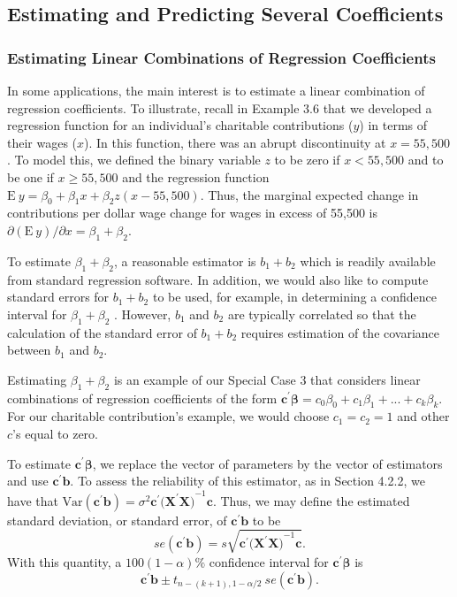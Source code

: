 \subsection{Estimating and Predicting Several Coefficients}

\subsubsection*{Estimating Linear Combinations of Regression Coefficients}

In some applications, the main interest is to estimate a linear
combination of regression coefficients. To illustrate, recall in
Example 3.6 that we developed a regression function for an
individual's charitable contributions ($y$) in terms of their wages
($x$). In this function, there was an abrupt discontinuity at
$x=55,500$. To model this, we defined the binary variable $z$ to be
zero if  $x<55,500$ and to be one if $x\geq 55,500$ and the
regression function $\mathrm{E~}y=\beta _{0}+\beta _{1}x+\beta
_{2}z(x-55,500)$. Thus, the marginal expected change in
contributions per dollar wage change for wages in excess of 55,500
is $\partial \left( \mathrm{E~}y\right) /\partial x=\beta _{1}+\beta
_{2}$.

To estimate $\beta _{1}+\beta _{2}$, a reasonable estimator is
$b_{1}+b_{2}$ which is readily available from standard regression
software. In addition, we would also like to compute standard errors
for $b_{1}+b_{2}$ to be used,
for example, in determining a confidence interval for $\beta _{1}+\beta _{2}$%
. However, $b_{1}$ and $b_{2}$ are typically correlated so that the
calculation of the standard error of $b_{1}+b_{2}$ requires
estimation of the covariance between $b_{1}$ and $b_{2}$.

Estimating $\beta_1 + \beta_2$ is an example of our Special Case 3
that considers linear combinations of regression coefficients of the
form $\mathbf{c}^{\prime }  \boldsymbol \beta=c_{0}\beta
_{0}+c_{1}\beta _{1}+...+c_{k}\beta _{k}$. For our charitable
contribution's example, we would choose $c_{1}=c_{2}=1$ and other
$c$'s equal to zero.

To estimate $\mathbf{c}^{\prime } \boldsymbol \beta $, we replace
the vector of
parameters by the vector of estimators and use $\mathbf{c}^{\prime }\mathbf{b%
}$. To assess the reliability of this estimator, as in Section
4.2.2, we have that $\mathrm{Var}\left( \mathbf{c}^{\prime
}\mathbf{b}\right) =\sigma ^{2} \mathbf{c}^{\prime
}(\mathbf{X^{\prime }X)}^{-1}\mathbf{c}$. Thus, we may define the
estimated standard deviation, or standard error, of $\mathbf{c}
^{\prime }\mathbf{b}$ to be
\begin{equation*}
se\left( \mathbf{c}^{\prime }\mathbf{b}\right) =s\sqrt{\mathbf{c}^{\prime }(%
\mathbf{X^{\prime }X)}^{-1}\mathbf{c}}.
\end{equation*}%
With this quantity, a $100(1-\alpha ) \%$ confidence interval for
$\mathbf{c}^{\prime } \boldsymbol \beta$ is
\begin{equation}  \label{E4:ConfIntLinCombination}
\mathbf{c}^{\prime }\mathbf{b}\pm t_{n-(k+1),1-\alpha /2} ~se(\mathbf{c}%
^{\prime }\mathbf{b}).
\end{equation}

